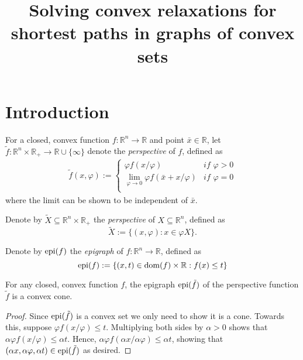\documentclass[letterpaper, 11pt]{article}
\title{Solving convex relaxations for shortest paths in graphs of convex sets}
\begin{document}
\maketitle
\abstract{ }

\section{Introduction}


\begin{defn}
  For a closed, convex function $f : \mathbb{R}^n \rightarrow \mathbb{R}$ 
  and point $\bar x \in \mathbb{R}$, let  $\tilde f : \mathbb{R}^n \times \mathbb{R}_{+} \rightarrow \mathbb{R} \cup \{\infty\}$
   denote the \emph{perspective} of $f$, defined as
  \begin{align}
\tilde f(x, \varphi) :=  \begin{cases}
  \varphi f(x/\varphi) & \textit{if } \varphi > 0 \\
  \lim_{\varphi \rightarrow 0} \varphi f(\bar x + x/\varphi) & \textit{if } \varphi = 0 \\
  \end{cases}
  \end{align}
  where the limit can be shown to be independent of $\bar x$.
\end{defn}

\begin{defn}
Denote by $\tilde X \subseteq \mathbb{R}^{n} \times \mathbb{R}_{+}$
the \emph{perspective} of $X \subseteq \mathbb{R}^n$, defined as
\[
  \tilde X := \{ (x, \varphi) :   x \in  \varphi X \}.
\]
\end{defn}

\begin{defn}
  Denote by $\operatorname{epi}(f)$ the \emph{epigraph} of $f : \mathbb{R}^n \rightarrow \mathbb{R}$, defined as
\[
  \operatorname{epi}(f) := \{ (x, t) \in \operatorname{dom}(f) \times \mathbb{R} : f(x) \le t \}
\]
\end{defn}


\begin{lem}
  For any closed, convex function $f$, the epigraph $\operatorname{epi}(\tilde f)$
  of the perspective function $\tilde f$ is a convex cone.
  \begin{proof}
    Since $\operatorname{epi}(\tilde f)$ is a convex set we only need to show it is a cone.
    Towards this, suppose $\varphi f(x/\varphi) \le t$. Multiplying both sides by $\alpha > 0$
    shows that $\alpha \varphi f(x/\varphi) \le  \alpha t$.
    Hence, $\alpha \varphi f(\alpha x/\alpha \varphi) \le  \alpha t$,
    showing that $(\alpha x, \alpha \varphi, \alpha t) \in \operatorname{epi}(\tilde f)$
    as desired.
  \end{proof}
\end{lem}
\end{document}
